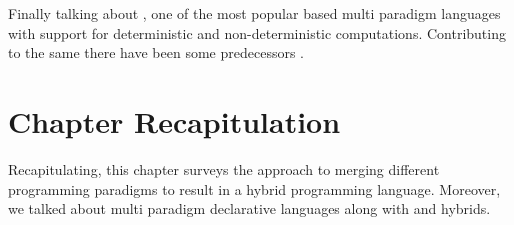 \documentclass[thesis-solanki.tex]{subfiles}
\begin{document}
Finally talking about , one of the most popular  based multi paradigm languages
with support for deterministic and non-deterministic computations. Contributing to the same there have been some
predecessors \cite{website:alf,website:toy}.        


\section{Chapter Recapitulation}
Recapitulating, this chapter surveys the approach to merging different programming paradigms to result in a hybrid programming language. Moreover, we talked about multi paradigm declarative languages along with  and  hybrids.  


\ifMain
\begin{scope}
  \nolinenumbers
  \enotesize
  \par
  \begin{singlespace}
  \setlength{\parskip}{12pt plus 2pt minus 1pt}
  \theendnotes
  \par
  \end{singlespace}
\end{scope}
\fi
\end{document}
